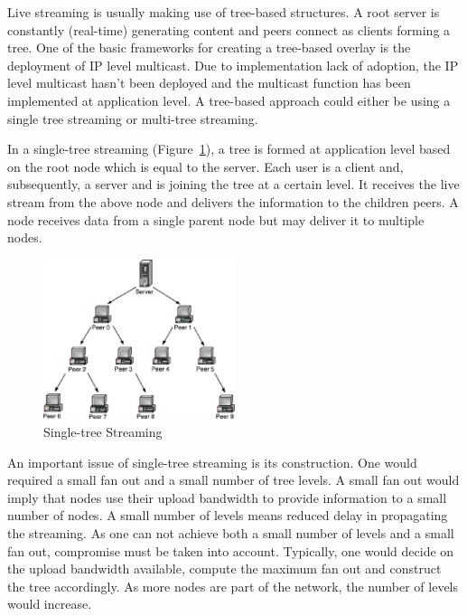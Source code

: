 Live streaming is usually making use of tree-based structures. A root server
is constantly (real-time) generating content and peers connect as clients
forming a tree. One of the basic frameworks for creating a tree-based overlay
is the deployment of IP level multicast. Due to implementation lack of
adoption, the IP level multicast hasn't been deployed and the multicast
function has been implemented at application level. A tree-based approach
could either be using a single tree streaming or multi-tree streaming.

In a single-tree streaming (Figure~\ref{fig:p2p-systems:single-tree-streaming}), a tree is
formed at application level based on the
root node which is equal to the server. Each user is a client and,
subsequently, a server and is joining the tree at a certain level. It receives
the live stream from the above node and delivers the information to the
children peers. A node receives data from a single parent node but may deliver
it to multiple nodes.

\begin{figure}
  \centering
  \includegraphics[width=0.5\textwidth]{src/img/p2p-systems/single-tree-streaming}
  \caption{Single-tree Streaming}
  \label{fig:p2p-systems:single-tree-streaming}
\end{figure}

An important issue of single-tree streaming is its construction. One would
required a small fan out and a small number of tree levels. A small fan out
would imply that nodes use their upload bandwidth to provide information to a
small number of nodes. A small number of levels means reduced delay in
propagating the streaming. As one can not achieve both a small number of
levels and a small fan out, compromise must be taken into account. Typically,
one would decide on the upload bandwidth available, compute the maximum fan
out and construct the tree accordingly. As more nodes are part of the network,
the number of levels would increase.

